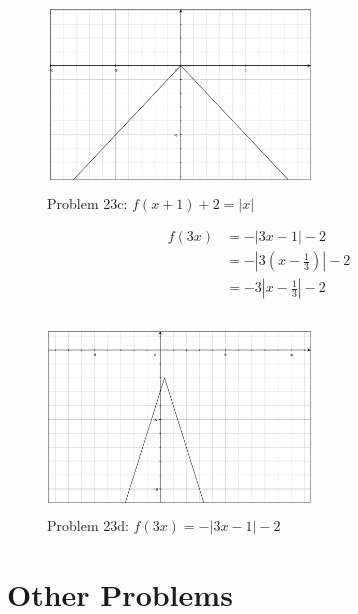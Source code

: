 \documentclass[fleqn,addpoints]{exam}
\begin{document}
\begin{itemize}
\begin{figure}[H]
  \centering
  \includegraphics[width=7cm,height=5cm]{1.9-23c.eps}
  \caption*{Problem 23c: $f(x+1) + 2 = |x|$}
\end{figure}

\begin{align*}
  f(3x) &= -|3x-1|-2 \\
        &= -\left| 3(x-\frac{1}{3}) \right| -2 \\
        &= -3 \left| x-\frac{1}{3} \right| -2 \\
\end{align*}

\begin{figure}[H]
  \centering
  \includegraphics[width=7cm,height=5cm]{1.9-23d.eps}
  \caption*{Problem 23d: $f(3x) = -|3x - 1| - 2$}
\end{figure}

\end{itemize}

\section{Other Problems}
\end{document}
